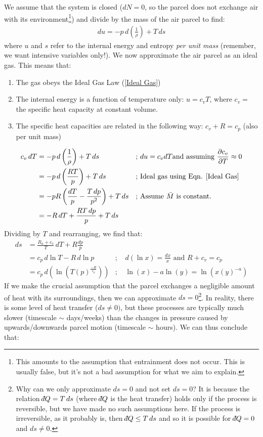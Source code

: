 We assume that the system is closed ($dN=0$, so the parcel does not exchange air with its environment\footnote{This amounts to the assumption that entrainment does not occur. This is usually false, but it's not a bad assumption for what we aim to explain.}) and divide by the mass of the air parcel to find: 
\begin{align*}
    du=-p\,d\left(\frac{1}{\rho}\right)+T\,ds
\end{align*}
where $u$ and $s$ refer to the internal energy and entropy \textit{per unit mass} (remember, we want intensive variables only!). We now approximate the air parcel as an ideal gas. This means that:

\begin{enumerate}
    \item The gas obeys the Ideal Gas Law (\ref{Ideal Gas})
    \item The internal energy is a function of temperature only: $u=c_vT$, where $c_v=$ the specific heat capacity at constant volume.
    \item The specific heat capacities are related in the following way: $c_v+R=c_p$ (also per unit mass)
\end{enumerate}
\begin{align*}
    c_v\,dT&=-p\,d\left(\frac{1}{\rho}\right)+T\,ds
    &\text{; }&du=c_vdT \text{and assuming } \frac{\partial c_v}{\partial T}\approx0
    \\
    &=-p\,d\left(\frac{RT}{p}\right)+T\,ds
    &\text{; }&\text{Ideal gas using Eqn. \ref{Ideal Gas}}
    \\
    &=-pR\left(\frac{dT}{p}-\frac{T\,dp}{p^2}\right)+T\,ds
    &\text{; }&\text{Assume } \bar{M} \text{ is constant.}
    \\
    &=-R\,dT+\frac{RT\,dp}{p}+T\,ds
\end{align*}
Dividing by $T$ and rearranging, we find that:
\begin{align*}
    ds & = \frac{R_a+c_v}{T}\,dT+R\frac{dp}{p}
    \\
     & = c_p\,d\ln T-R\,d\ln p
     &\text{; }& d(\ln x)=\frac{dx}{x}\text{ and } R+c_v=c_p
     \\
     & = c_p\,d\left(\ln \left(T(p)^\frac{-R}{c_p}\right)\right)
     &\text{; }&\ln(x)-a\ln(y)=\ln\left(x(y)^{-a}\right)
\end{align*}
If we make the crucial assumption that the parcel exchanges a negligible amount of heat with its surroundings, then we can approximate $ds=0$\footnote{
    Why can we only approximate $ds=0$ and not set $ds=0$? It is because the relation  $\dbar Q=T\,ds$ (where  $\dbar Q$ is the heat transfer) holds only if the process is reversible, but we have made no such assumptions here. If the process is irreversible, as it probably is, then  $\dbar Q\leq T\,ds$ and so it is possible for  $\dbar Q=0$ and $ds\neq 0$.
}. In reality, there is some level of heat transfer ($ds\neq0)$, but these processes are typically much slower (timescale $\sim$ days/weeks) than the changes in pressure caused by upwards/downwards parcel motion (timescale $\sim$ hours). We can thus conclude that:

